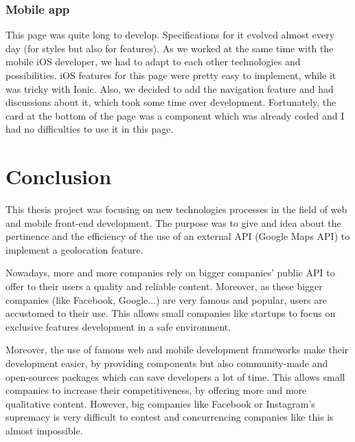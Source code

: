 \documentclass{article}
\begin{document}
                \subsubsection{Mobile app}
                    This page was quite long to develop. Specifications for it evolved almost every day (for styles but also for features). As we 
                    worked at the same time with the mobile iOS developer, we had to adapt to each other technologies and possibilities. iOS features for
                    this page were pretty easy to implement, while it was tricky with Ionic. Also, we decided to add the navigation feature and had 
                    discussions about it, which took some time over development. Fortunately, the card at the bottom of the page was a component
                    which was already coded and I had no difficulties to use it in this page.\\

        \newpage
        \section{Conclusion}
            This thesis project was focusing on new technologies processes in the field of web and mobile front-end development. The purpose was to give and idea about
            the pertinence and the efficiency of the use of an external API (Google Maps API) to implement a geolocation feature.
            
            \vspace{1cm}

            Nowadays, more and more companies rely on bigger companies' public API to offer to their users a quality and reliable content. Moreover,
            as these bigger companies (like Facebook, Google...) are very famous and popular, users are accustomed to their use. This allows small companies
            like startups to focus on exclusive features development in a safe environment.

            \vspace{1cm}

            Moreover, the use of famous web and mobile development frameworks make their development easier, by providing components but also community-made and
            open-sources packages which can save developers a lot of time. This allows small companies to increase their competitiveness, by offering more and more
            qualitative content. However, big companies like Facebook or Instagram's supremacy is very difficult to contest and concurrencing companies like this is 
            almost impossible.
\end{document}
